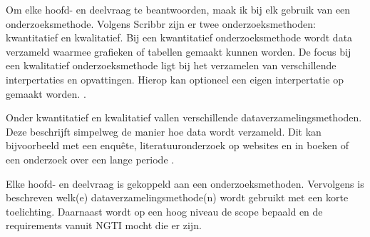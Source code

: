 
{\renewcommand{\arraystretch}{1.35}%

Om elke hoofd- en deelvraag te beantwoorden, maak ik bij elk gebruik van een onderzoeksmethode. Volgens Scribbr \cite{research-methods} zijn er twee onderzoeksmethoden: kwantitatief en kwalitatief. Bij een kwantitatief onderzoeksmethode wordt data verzameld waarmee grafieken of tabellen gemaakt kunnen worden. De focus bij een kwalitatief onderzoeksmethode ligt bij het verzamelen van verschillende interpertaties en opvattingen. Hierop kan optioneel een eigen interpertatie op gemaakt worden. \cite{quantitative-vs-qualitative}.

Onder kwantitatief en kwalitatief vallen verschillende dataverzamelingsmethoden. Deze beschrijft simpelweg de manier hoe data wordt verzameld. Dit kan bijvoorbeeld met een enquête, literatuuronderzoek op websites en in boeken of een onderzoek over een lange periode \cite{quantitative-vs-qualitative}.

Elke hoofd- en deelvraag is gekoppeld aan een onderzoeksmethoden. Vervolgens is beschreven welk(e) dataverzamelingsmethode(n) wordt gebruikt met een korte toelichting. Daarnaast wordt op een hoog niveau de scope bepaald en de requirements vanuit NGTI mocht die er zijn.

}
